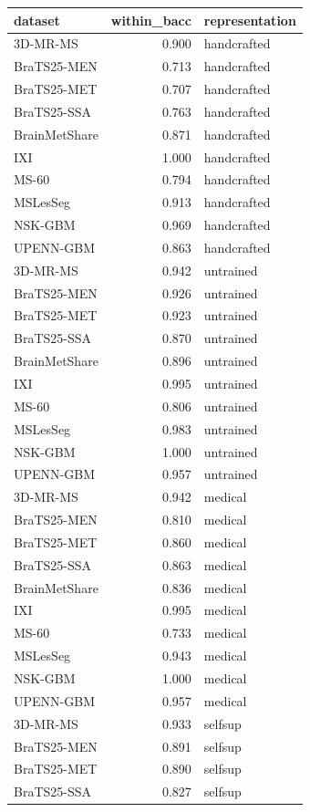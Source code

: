 \begin{tabular}{lrl}
\toprule
dataset & within\_bacc & representation \\
\midrule
3D-MR-MS & 0.900 & handcrafted \\
BraTS25-MEN & 0.713 & handcrafted \\
BraTS25-MET & 0.707 & handcrafted \\
BraTS25-SSA & 0.763 & handcrafted \\
BrainMetShare & 0.871 & handcrafted \\
IXI & 1.000 & handcrafted \\
MS-60 & 0.794 & handcrafted \\
MSLesSeg & 0.913 & handcrafted \\
NSK-GBM & 0.969 & handcrafted \\
UPENN-GBM & 0.863 & handcrafted \\
3D-MR-MS & 0.942 & untrained \\
BraTS25-MEN & 0.926 & untrained \\
BraTS25-MET & 0.923 & untrained \\
BraTS25-SSA & 0.870 & untrained \\
BrainMetShare & 0.896 & untrained \\
IXI & 0.995 & untrained \\
MS-60 & 0.806 & untrained \\
MSLesSeg & 0.983 & untrained \\
NSK-GBM & 1.000 & untrained \\
UPENN-GBM & 0.957 & untrained \\
3D-MR-MS & 0.942 & medical \\
BraTS25-MEN & 0.810 & medical \\
BraTS25-MET & 0.860 & medical \\
BraTS25-SSA & 0.863 & medical \\
BrainMetShare & 0.836 & medical \\
IXI & 0.995 & medical \\
MS-60 & 0.733 & medical \\
MSLesSeg & 0.943 & medical \\
NSK-GBM & 1.000 & medical \\
UPENN-GBM & 0.957 & medical \\
3D-MR-MS & 0.933 & selfsup \\
BraTS25-MEN & 0.891 & selfsup \\
BraTS25-MET & 0.890 & selfsup \\
BraTS25-SSA & 0.827 & selfsup \\

\end{tabular}
